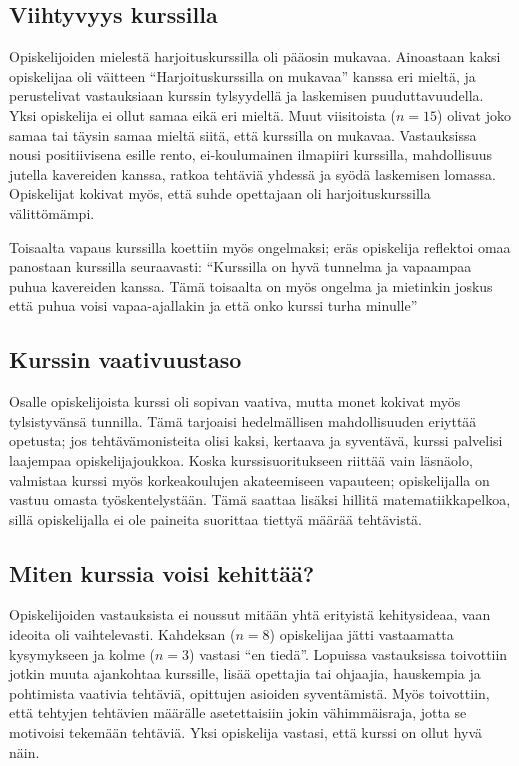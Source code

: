 \subsection{Viihtyvyys kurssilla}
Opiskelijoiden mielestä harjoituskurssilla oli pääosin mukavaa. Ainoastaan kaksi opiskelijaa oli väitteen ``Harjoituskurssilla on mukavaa'' kanssa eri mieltä, ja perustelivat vastauksiaan kurssin tylsyydellä ja laskemisen puuduttavuudella. Yksi opiskelija ei ollut samaa eikä eri mieltä. Muut viisitoista ($n=15$) olivat joko samaa tai täysin samaa mieltä siitä, että kurssilla on mukavaa. Vastauksissa nousi positiivisena esille rento, ei-koulumainen ilmapiiri kurssilla, mahdollisuus jutella kavereiden kanssa, ratkoa tehtäviä yhdessä ja syödä laskemisen lomassa. Opiskelijat kokivat myös, että suhde opettajaan oli harjoituskurssilla välittömämpi. 

Toisaalta vapaus kurssilla koettiin myös ongelmaksi; eräs opiskelija reflektoi omaa panostaan kurssilla seuraavasti: ``Kurssilla on hyvä tunnelma ja vapaampaa puhua kavereiden kanssa. Tämä toisaalta on myös ongelma ja mietinkin joskus että puhua voisi vapaa-ajallakin ja että onko kurssi turha minulle''



\subsection{Kurssin vaativuustaso}
Osalle opiskelijoista kurssi oli sopivan vaativa, mutta monet kokivat myös tylsistyvänsä tunnilla.
Tämä tarjoaisi hedelmällisen mahdollisuuden eriyttää opetusta; jos tehtävämonisteita olisi kaksi, kertaava ja syventävä, kurssi palvelisi laajempaa opiskelijajoukkoa.
Koska kurssisuoritukseen riittää vain läsnäolo, valmistaa kurssi myös korkeakoulujen akateemiseen vapauteen; opiskelijalla on vastuu omasta työskentelystään.
Tämä saattaa lisäksi hillitä matematiikkapelkoa, sillä opiskelijalla ei ole paineita suorittaa tiettyä määrää tehtävistä.

\subsection{Miten kurssia voisi kehittää?}
Opiskelijoiden vastauksista ei noussut mitään yhtä erityistä kehitysideaa, vaan ideoita oli vaihtelevasti. Kahdeksan ($n=8$) opiskelijaa jätti vastaamatta kysymykseen ja kolme ($n=3$) vastasi ``en tiedä''. Lopuissa vastauksissa toivottiin jotkin muuta ajankohtaa kurssille, lisää opettajia tai ohjaajia, hauskempia ja pohtimista vaativia tehtäviä, opittujen asioiden syventämistä. Myös toivottiin, että tehtyjen tehtävien määrälle asetettaisiin jokin vähimmäisraja, jotta se motivoisi tekemään tehtäviä. Yksi opiskelija vastasi, että kurssi on ollut hyvä näin. 



